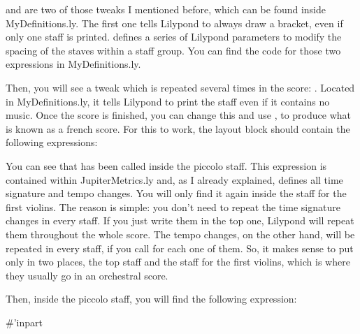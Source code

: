 \documentclass[../../LilyPond-Tutorials]{subfiles}
\begin{document}
 and  are two of those tweaks I mentioned before, which can be found inside MyDefinitions.ly.
The first one tells Lilypond to always draw a bracket, even if only one staff is printed.
 defines a series of Lilypond parameters to modify the spacing of the staves within a staff group.
You can find the code for those two expressions in MyDefinitions.ly.


Then, you will see a tweak which is repeated several times in the score: .
Located in MyDefinitions.ly, it tells Lilypond to print the staff even if it contains no music.
Once the score is finished, you can change this and use , to produce what is known as a french score.
For this to work, the layout block should contain the following expressions:

\begin{lilypondcode}
\context { \Staff \RemoveEmptyStaves }
\context { \DrumStaff \RemoveEmptyStaves }
\end{lilypondcode}

You can see that  has been called inside the piccolo staff.
This expression is contained within JupiterMetrics.ly and, as I already explained, defines all time signature and tempo changes.
You will only find it again inside the staff for the first violins.
The reason is simple: you don't need to repeat the time signature changes in every staff. If you just write them in the top one, Lilypond will repeat them throughout the whole score.
The tempo changes, on the other hand, will be repeated in every staff, if you call  for each one of them.
So, it makes sense to put  only in two places, the top staff and the staff for the first violins, which is where they usually go in an orchestral score.

Then, inside the piccolo staff, you will find the following expression:

\begin{lilypondcode}
\removeWithTag #'inpart { 
       \killCues { 
              \partcombine 
                     \PiccoloOne 
                     \PiccoloTwo 
       } 
}
\end{lilypondcode}
\end{document}
